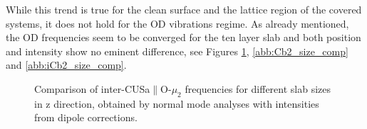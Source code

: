 \documentclass[11pt,DIV=13,BCOR=5mm,a4paper,headinclude]{scrbook}
\begin{document}
While this trend is true for the clean surface and the lattice region of the covered systems, it does not hold for the OD vibrations regime.
As already mentioned, the OD frequencies seem to be converged for the ten layer slab and both position and intensity show no eminent difference, see Figures \ref{abb:iCa2_size_comp}, \ref{abb:Cb2_size_comp} and \ref{abb:iCb2_size_comp}.
\begin{figure}[!h]
    \centering
             \quad
             \quad
             \caption{Comparison of inter-CUSa$\parallel$O-$\mu_2$ frequencies for different slab sizes in z direction, obtained by normal mode analyses with intensities from dipole corrections.}
            \label{abb:iCa2_size_comp}
\end{figure}
\end{document}
